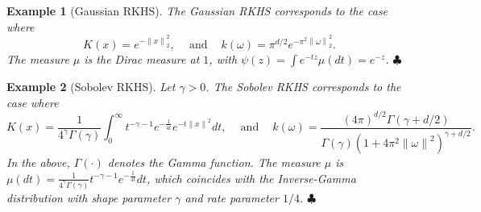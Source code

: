 \documentclass[sn-mathphys-num]{sn-jnl}%
\numberwithin{equation}{section}
\newcommand{\R}{\mathbb{R}}
\newcommand{\kernel}{K}
\newcommand{\norm}[1]{\left\|{#1}\right\|} %
\theoremstyle{thmstyleone}%
\theoremstyle{thmstyletwo}%
\newtheorem{example}{Example}%
\theoremstyle{thmstylethree}%
\begin{document}
\vspace{.5em}
\begin{example} [Gaussian RKHS]
The Gaussian RKHS corresponds to the case where
\begin{equation*}
	\kernel(x) = e^{-\norm{x}_2^2},\quad~\text{and}~\quad k(\omega) = \pi^{d/2} e^{- \pi^2 \norm{\omega}_2^2}.
\end{equation*} 
The measure $\mu$ is the Dirac measure at $1$, with $\psi(z) = \int e^{-tz}\mu(dt) = e^{-z}$. $\clubsuit$
\end{example} 

\vspace{.5em}

\begin{example} [Sobolev RKHS]
Let $\gamma > 0$. The Sobolev RKHS corresponds to the case where
\begin{equation*}
	\kernel(x) = \frac{1}{4^\gamma \Gamma(\gamma)} \int_0^\infty t^{-\gamma-1} e^{-\frac{1}{4t}} e^{- t\norm{x}^2} dt,\quad~\text{and}~\quad k(\omega) = \frac{(4\pi)^{d/2}\Gamma(\gamma+d/2)}{\Gamma(\gamma)(1+ 4\pi^2 \norm{\omega}^2)^{\gamma+d/2}}.
\end{equation*} 
In the above, $\Gamma(\cdot)$ denotes the Gamma function. 
The measure $\mu$ is $\mu(dt) = \frac{1}{4^\gamma \Gamma(\gamma)} t^{-\gamma-1} e^{-\frac{1}{4t}} dt$, which coincides with the Inverse-Gamma distribution with shape parameter $\gamma$ and rate parameter $1/4$. $\clubsuit$
\end{example} 







\end{document}
